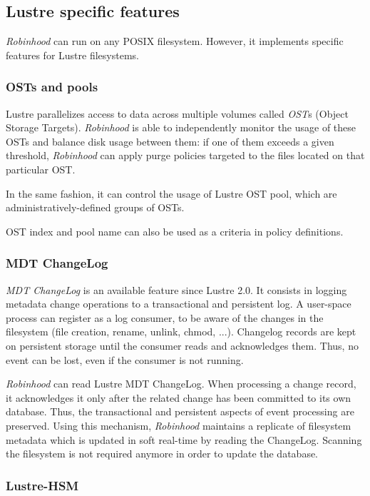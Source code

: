 \documentclass[conference]{IEEEtran}
\begin{document}
\subsection{Lustre specific features}
\emph{Robinhood} can run on any POSIX filesystem.
However, it implements specific features for Lustre filesystems.
\subsubsection{OSTs and pools}
Lustre parallelizes access to data
across multiple vo\-lumes called {\it OST}s (Object Storage Targets).
\emph{Robinhood} is able to independently monitor the usage of these OSTs and balance
disk usage between them: if one of them exceeds a given threshold,
\emph{Robinhood} can apply purge policies targeted to the files located on that
particular OST.

In the same fashion, it can control the usage of Lustre OST pool, which are
administratively-defined groups of OSTs.

OST index and pool name can also be used as a criteria in policy definitions.

\subsubsection{MDT ChangeLog}
\emph{MDT ChangeLog} is an available feature since
Lustre 2.0. It consists in logging metadata change operations to a transactional
and persistent log. A user-space process can register as a log consumer,
to be aware of the changes in the filesystem (file creation, rename, unlink,
chmod, ...). Changelog records are kept on persistent storage until the
consumer reads and acknowledges them. Thus, no event can be lost, even if the
consumer is not running.

\emph{Robinhood} can read Lustre MDT ChangeLog. When processing a change record,
it acknowledges it only after the related change has been committed to its own
database. Thus, the transactional and persistent aspects of event processing are
preserved. Using this mechanism, \emph{Robinhood} maintains a replicate of
filesystem metadata which is updated in soft real-time by reading the ChangeLog.
Scanning the filesystem is not required anymore in order to update the database.

\subsubsection{Lustre-HSM}
\end{document}
